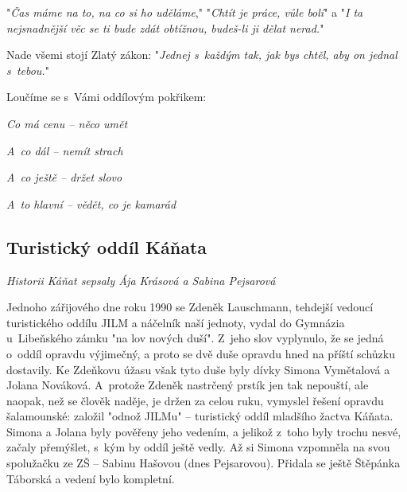 \documentclass[a5paper, 11pt, twoside]{article}
\begin{document}
"\textit{Čas máme na to, na co si ho uděláme}," "\textit{Chtít je práce, vůle bolí}" a "\textit{I ta nejsnadnější věc se ti bude zdát obtížnou, budeš-li ji dělat nerad.}"

Nade všemi stojí Zlatý zákon: "\textit{Jednej s~každým tak, jak bys chtěl, aby on jednal s~tebou.}"

\medskip
Loučíme se s~Vámi oddílovým pokřikem:

\textit{Co má cenu -- něco umět}

\textit{A~co dál -- nemít strach}

\textit{A~co ještě -- držet slovo}

\textit{A~to hlavní -- vědět, co je kamarád}

\clearpage
\subsection{Turistický oddíl Káňata}

\begin{center}
  \textit{Historii Káňat sepsaly Ája Krásová a Sabina Pejsarová}
\end{center}

\noindent
Jednoho zářijového dne roku 1990 se Zdeněk Lauschmann, tehdejší vedoucí
turistického oddílu JILM a náčelník naší jednoty, vydal do Gymnázia
u~Libeňského zámku "na lov nových duší". Z~jeho slov vyplynulo, že se
jedná o~oddíl opravdu výjimečný, a proto se dvě duše opravdu hned na
příští schůzku dostavily. Ke Zdeňkovu úžasu však tyto duše byly dívky
Simona Vymětalová a Jolana Nováková. A~protože Zdeněk nastrčený prstík
jen tak nepouští, ale naopak, než se člověk naděje, je držen za celou
ruku, vymyslel řešení opravdu šalamounské: založil "odnož JILMu" --
turistický oddíl mladšího žactva Káňata. Simona a Jolana byly pověřeny
jeho vedením, a jelikož z~toho byly trochu nesvé, začaly přemýšlet,
s~kým by oddíl ještě vedly. Až si Simona vzpomněla na svou spolužačku ze
ZŠ -- Sabinu Hašovou (dnes Pejsarovou). Přidala se ještě Štěpánka
Táborská a vedení bylo kompletní.
\end{document}
